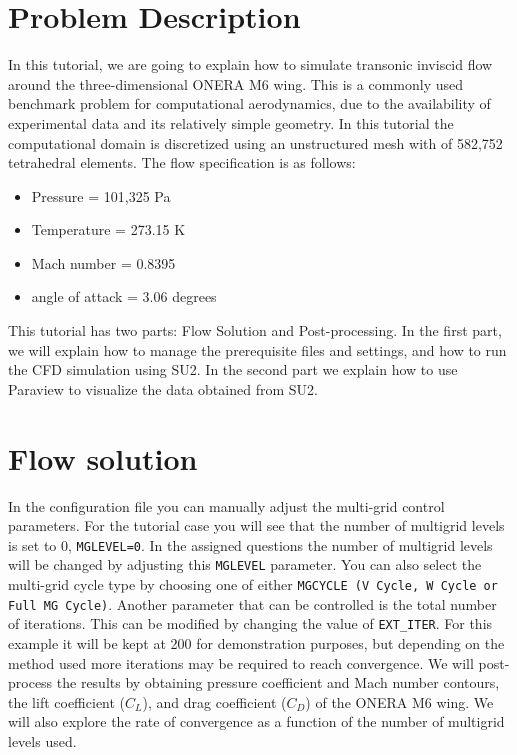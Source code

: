 \section{Problem Description}
In this tutorial, we are going to explain how to simulate transonic inviscid flow around the three-dimensional ONERA M6 wing. This is a commonly used benchmark problem for computational aerodynamics, due to the availability of experimental data and its relatively simple geometry. In this tutorial the computational domain is discretized using an unstructured mesh with of 582,752 tetrahedral elements. The flow specification is as follows:
\begin{itemize}
    \item Pressure = 101,325 Pa
    \item Temperature = 273.15 K
    \item Mach number = 0.8395
    \item angle of attack = 3.06 degrees
\end{itemize}

This tutorial has two parts: Flow Solution and Post-processing. In the first part, we will explain how to manage the prerequisite files and settings, and how to run the CFD simulation using SU2. In the second part we explain how to use Paraview to visualize the data obtained from SU2.
\section{Flow solution}
In the configuration file you can manually adjust the multi-grid control parameters. For the tutorial case you will see that the number of multigrid levels is set to 0, \texttt{MGLEVEL=0}. In the assigned questions the number of multigrid levels will be changed by adjusting this \texttt{MGLEVEL} parameter. You can also select the multi-grid cycle type by choosing one of either \texttt{MGCYCLE (V Cycle, W Cycle or Full MG Cycle)}. Another parameter that can be controlled is the total number of iterations. This can be modified by changing the value of \texttt{EXT\_ITER}. For this example it will be kept at 200 for demonstration purposes, but depending on the method used more iterations may be required to reach convergence. We will post-process the results by obtaining pressure coefficient and Mach number contours, the lift coefficient ($C_L$), and drag coefficient ($C_D$) of the ONERA M6 wing. We will also explore the rate of convergence as a function of the number of multigrid levels used.

